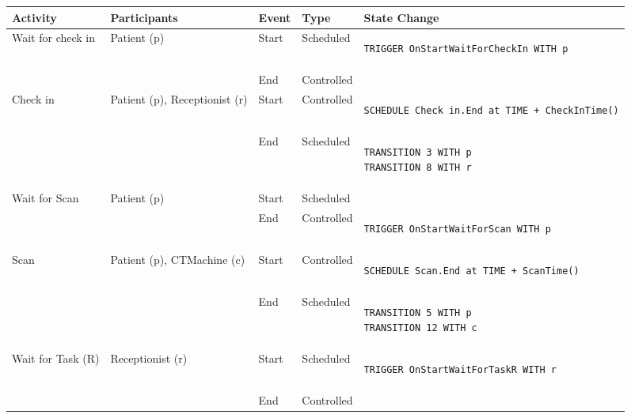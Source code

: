\begin{tabular}{@{}>{\raggedright\arraybackslash}p{1.5cm}>{\raggedright\arraybackslash}p{2.1cm}>{\raggedright\arraybackslash}p{0.9cm}>{\raggedright\arraybackslash}p{2.2cm}>{\raggedright\arraybackslash}p{8cm}@{}}
  \toprule
  Activity          & Participants & Event & Type       & State Change \\ \midrule
  Wait for check in & Patient (p)  & Start & Scheduled  & 
  \vspace{-12pt}
  \begin{lstlisting}[language=CMPseudo]
TRIGGER OnStartWaitForCheckIn WITH p
  \end{lstlisting}
  \\ \cmidrule{3-5}
                    &              & End   & Controlled &
  
  \\ \midrule
  Check in & Patient (p), Receptionist (r)  & Start & Controlled  & 
  \vspace{-12pt}
  \begin{lstlisting}[language=CMPseudo]
SCHEDULE Check in.End at TIME + CheckInTime()
  \end{lstlisting}
  \\ \cmidrule{3-5}
                    &              & End   & Scheduled &
  \vspace{-12pt}
  \begin{lstlisting}[language=CMPseudo]
TRANSITION 3 WITH p
TRANSITION 8 WITH r
  \end{lstlisting}          
  \\ \midrule
  Wait for Scan & Patient (p)  & Start & Scheduled  &              \\ \cmidrule{3-5}
                &              & End   & Controlled &
  \vspace{-12pt}
  \begin{lstlisting}[language=CMPseudo]
TRIGGER OnStartWaitForScan WITH p
  \end{lstlisting}
  \\ \midrule
  Scan & Patient (p), CTMachine (c)  & Start & Controlled  & 
  \vspace{-12pt}
  \begin{lstlisting}[language=CMPseudo]
SCHEDULE Scan.End at TIME + ScanTime()
  \end{lstlisting}
  \\ \cmidrule{3-5}
                    &              & End   & Scheduled &
  \vspace{-12pt}
  \begin{lstlisting}[language=CMPseudo]
TRANSITION 5 WITH p
TRANSITION 12 WITH c
  \end{lstlisting}          
  \\ \midrule
  Wait for Task (R) & Receptionist (r)  & Start & Scheduled  &
  \vspace{-12pt}
  \begin{lstlisting}[language=CMPseudo]
TRIGGER OnStartWaitForTaskR WITH r
  \end{lstlisting}
  \\ \cmidrule{3-5}
                    &              & End   & Controlled &
  

\end{tabular}
